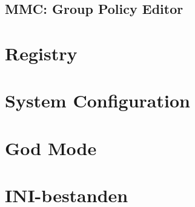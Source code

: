 \documentclass[a4paper,12pt,twoside,titlepage]{article}
\begin{document}
\subsection{MMC: Group Policy Editor}


\section{Registry}


\section{System Configuration}


\section{God Mode}


\section{INI-bestanden}


\printindex
\end{document}
